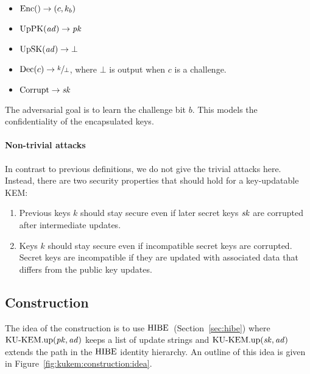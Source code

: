 \begin{itemize}
    \item $\mathrm{Enc}()\to(c,k_b)$
    \item $\mathrm{UpPK}(\mathit{ad})\to\mathit{pk}$
    \item $\mathrm{UpSK}(\mathit{ad})\to\bot$
    \item $\mathrm{Dec}(c)\to\sfrac{k}{\bot}$, where $\bot$ is output when $c$ is a challenge.
    \item $\mathrm{Corrupt}\to\mathit{sk}$
\end{itemize}  

The adversarial goal is to learn the challenge bit $b$. This models the confidentiality of the encapsulated keys.

\paragraph{Non-trivial attacks} In contrast to previous definitions, we do not give the trivial attacks here.
Instead, there are two security properties that should hold for a key-updatable KEM:
\begin{enumerate}
    \item 
    \begin{minipage}[t]{.5\linewidth}
        Previous keys $k$ should stay secure even if later secret keys $\mathit{sk}$ are corrupted after intermediate updates.
    \end{minipage}\hfill
    \begin{minipage}[t][][b]{.5\linewidth}
        \centering
        \vspace{-.7\baselineskip} %
        
    \end{minipage}
    \item \begin{minipage}[t]{.5\linewidth}
        Keys $k$ should stay secure even if incompatible secret keys are corrupted.
        Secret keys are incompatible if they are updated with associated data that differs from the public key updates.
    \end{minipage}\hfill
    \begin{minipage}[t][][b]{.5\linewidth}
        \centering
        \vspace{-.7\baselineskip}
        
    \end{minipage}
\end{enumerate}

\subsection{Construction} 
The idea of the construction is to use $\mathrm{HIBE}$~(Section~\ref{sec:hibe}) where $\mathrm{KU}\text{-}\mathrm{KEM}.\mathrm{up}(\mathit{pk},\mathit{ad})$ keeps a list of update strings and $\mathrm{KU}\text{-}\mathrm{KEM}.\mathrm{up}(\mathit{sk},\mathit{ad})$ extends the path in the $\mathrm{HIBE}$ identity hierarchy.
An outline of this idea is given in Figure~\ref{fig:kukem:construction:idea}.

